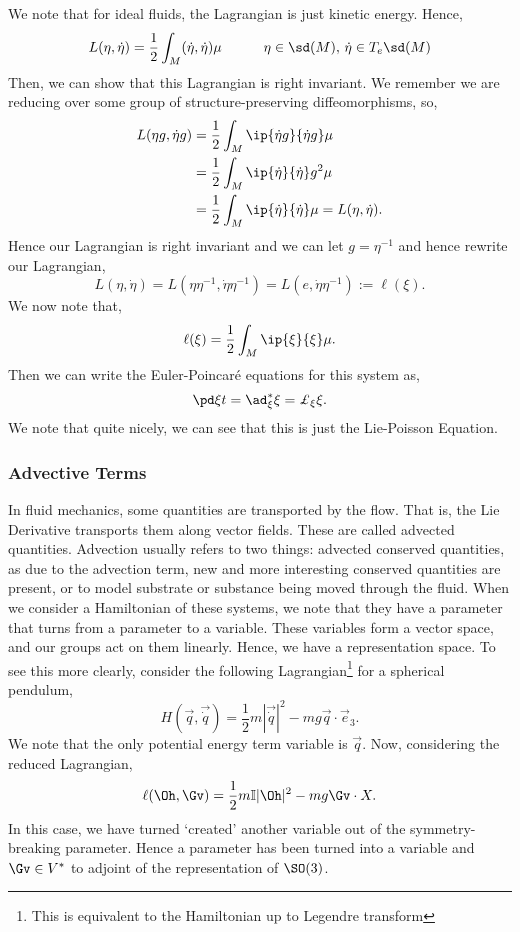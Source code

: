 \noindent
We note that for ideal fluids, the Lagrangian is just kinetic energy. Hence,
$$ L(\eta, \dot \eta) = \frac{1}{2}\int_M (\dot \eta, \dot \eta) \mu \qquad \quad \eta \in \sd (M),\, \dot \eta \in T_e\sd (M)$$
Then, we can show that this Lagrangian is right invariant. We remember we are reducing over some group of structure-preserving diffeomorphisms, so,
\begin{align*}
  L(\eta g, \dot \eta g) &= \frac{1}{2}\int_M \ip{\dot \eta g}{\dot \eta g}\mu \\
  &= \frac{1}{2}\int_M \ip{\dot \eta}{\dot \eta} g^2\mu \\
  &= \frac{1}{2}\int_M \ip{\dot \eta}{\dot \eta}\mu  = L(\eta, \dot \eta).
\end{align*}
\noindent
Hence our Lagrangian is right invariant and we can let $g = \eta^{-1}$ and hence rewrite our Lagrangian,
$$ L(\eta, \dot \eta) = L(\eta\eta^{-1}, \dot \eta \eta^{-1}) = L(e, \dot \eta \eta^{-1}) := \ell(\xi). $$
We now note that,
$$ \ell(\xi) = \frac{1}{2}\int_M \ip{\xi}{\xi}\mu. $$
Then we can write the Euler-Poincar\'e equations for this system as,
$$ \pd \xi t = \ad^*_\xi\xi = \pounds_\xi \xi. $$
We note that quite nicely, we can see that this is just the Lie-Poisson Equation.\\

\subsubsection{Advective Terms}
In fluid mechanics, some quantities are transported by the flow. That is, the Lie Derivative transports them along vector fields. These are called advected quantities. Advection usually refers to two things: advected conserved quantities, as due to the advection term, new and more interesting conserved quantities are present, or to model substrate or substance being moved through the fluid. When we consider a Hamiltonian of these systems, we note that they have a parameter that turns from a parameter to a variable. These variables form a vector space, and our groups act on them linearly. Hence, we have a representation space. To see this more clearly, consider the following Lagrangian\footnote{This is equivalent to the Hamiltonian up to Legendre transform} for a spherical pendulum,
$$ H(\vec q, \vec{\dot q}) = \frac{1}{2}m |\vec{\dot q}|^2 - mg \vec q \cdot \vec e_3. $$
We note that the only potential energy term variable is $\vec q$. Now, considering the reduced Lagrangian,
$$ \ell(\Oh, \Gv) = \frac{1}{2}m \mathbb{I}|\Oh|^2 - mg\Gv \cdot X. $$
In this case, we have turned `created' another variable out of the symmetry-breaking parameter. Hence a parameter has been turned into a variable and $\Gv \in V^*$ to adjoint of the representation of $\SO(3)$.\\

